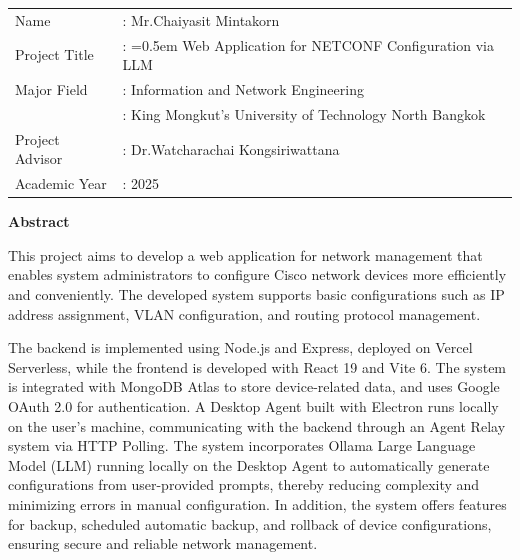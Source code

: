 \begin{tabularx}{\textwidth}{lX}
Name                    & : Mr.Chaiyasit Mintakorn  %
\\
Project Title           & : \hangindent=0.5em %
                            Web Application for NETCONF Configuration via LLM  %
\\
Major Field             & : Information and Network Engineering %
\\
                        & : King Mongkut’s University of Technology North Bangkok
\\
Project Advisor         & : Dr.Watcharachai Kongsiriwattana   %
\\
Academic Year           & : 2025    %
\end{tabularx}

\vspace{5mm}
\begin{center}\textbf{Abstract}\end{center}

\hspace*{1.3em} %
 This project aims to develop a web application for network management that
 enables system administrators to configure Cisco network devices more efficiently and
 conveniently. The developed system supports basic configurations such as IP address
 assignment, VLAN configuration, and routing protocol management.
 
 \hspace*{1.3em} %
 The backend is implemented using Node.js and Express, deployed on Vercel
 Serverless, while the frontend is developed with React 19 and Vite 6. The system is
 integrated with MongoDB Atlas to store device-related data, and uses Google OAuth 2.0
 for authentication. A Desktop Agent built with Electron runs locally on the user's
 machine, communicating with the backend through an Agent Relay system via HTTP
 Polling. The system incorporates Ollama Large Language Model (LLM) running locally
 on the Desktop Agent to automatically generate configurations from user-provided
 prompts, thereby reducing complexity and minimizing errors in manual configuration.
 In addition, the system offers features for backup, scheduled automatic backup, and
 rollback of device configurations, ensuring secure and reliable network management.

